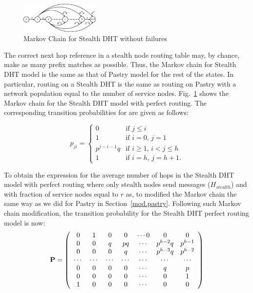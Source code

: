 \documentclass[10pt,twocolumn]{article}
\begin{document}
\begin{figure}[tb] \centering
     {\includegraphics[width=0.35\textwidth]{Markov-SDHT-NoFail.eps}
     \caption{Markov Chain for Stealth DHT  without failures}
     \label{fig.sdht}}
\end{figure}

The correct next hop reference in a stealth node routing table may, by chance,
make as many prefix matches as possible. Thus, the Markov chain for Stealth DHT
model is the same as that of Pastry model for the rest of the states. In
particular, routing on a Stealth DHT is the same as routing on Pastry with a
network population equal to the number of service nodes. Fig.~\ref{fig.sdht}
shows the Markov chain for the Stealth DHT model with perfect routing. The
corresponding transition probabilities for are given as follows:

\[ p_{ji} = \left\{ \begin{array}{ll}
         0 & \mbox{if $j \le i$}\\
         1 & \mbox{if $i = 0$, $j = 1$}\\
         p^{j-i-1}q & \mbox{if $i \ge 1$, $i < j \le  h$} \\
         1   &  \mbox{if $i = h$, $j=h+1$}
         .\end{array} \right. \]

To  obtain the expression for the average number of hops in the
Stealth DHT model with perfect routing where only stealth nodes send
messages ($H_{stealth}$) and with fraction of service nodes equal to
$r$ as, to modified the Markov chain the same way as we did for
Pastry in Section~\ref{mod.pastry}. Following such Markov chain
modification, the transition probability for the Stealth DHT perfect
routing model is now:
\[ {\bf P} = \left( \begin{array}{ccccccc}
0 & 1 & 0 & 0 & \cdots  0 & 0  & 0\\
0 & 0 & q & pq & \cdots &p^{h-2}q & p^{h-1}\\
0 & 0 & 0 &q & \cdots & p^{h-3}q & p^{h-2} \\
\cdots & \cdots & \cdots &\cdots & \cdots & \cdots & \cdots \\
0 & 0 & 0 &0 & \cdots & q & p \\
0 & 0 & 0 &0 & \cdots & 0 & 1 \\
1 & 0 & 0 &0 & \cdots & 0 & 0  \end{array} \right)\]
\end{document}
